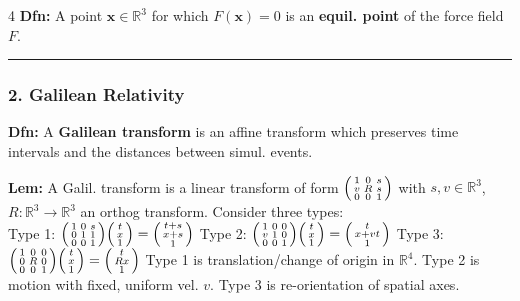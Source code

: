 \documentclass[landscape, 8pt]{extarticle}
\begin{document}
\begin{multicols*}{4}
		\textbf{Dfn:} A point $\mathbf{x}\in\mathbb{R}^3$ for which $F(\mathbf{x})=0$ is an \textbf{equil. point} of the force field $F$.
		
		\hrule
		\vspace*{-3pt}
		\subsubsection*{\tiny{2. Galilean Relativity}}
		\vspace*{-5pt}
		
		\textbf{Dfn:} A \textbf{Galilean transform} is an affine transform which preserves time intervals and the distances between simul. events.
		
		\textbf{Lem:} A Galil. transform is a linear transform of form
		$
		\begin{psmallmatrix*}1 & 0 & s\\ v & R & s\\ 0 & 0 & 1\end{psmallmatrix*}
		$
		with $s,v\in\mathbb{R}^3$, $R:\mathbb{R}^3\to\mathbb{R}^3$ an orthog transform.
		Consider three types: \\
		Type 1:
		$
		\begin{psmallmatrix*}1&0&s\\0&1&1\\0&0&1\end{psmallmatrix*}\begin{psmallmatrix*}t\\x\\1\end{psmallmatrix*}=\begin{psmallmatrix*}t+s\\x+s\\1\end{psmallmatrix*}
		$
		Type 2:
		$
		\begin{psmallmatrix*}1&0&0\\v&1&0\\0&0&1\end{psmallmatrix*}\begin{psmallmatrix*}t\\x\\1\end{psmallmatrix*}=\begin{psmallmatrix*}t\\x+vt\\1\end{psmallmatrix*}
		$
		Type 3:
		$
		\begin{psmallmatrix*}1&0&0\\0&R&0\\0&0&1\end{psmallmatrix*}\begin{psmallmatrix*}t\\x\\1\end{psmallmatrix*}=\begin{psmallmatrix*}t\\Rx\\1\end{psmallmatrix*}
		$
		Type 1 is translation/change of origin in $\mathbb{R}^4$. Type 2 is motion with fixed, uniform vel. $v$. Type 3 is re-orientation of spatial axes.
		

\end{multicols*}
\end{document}

